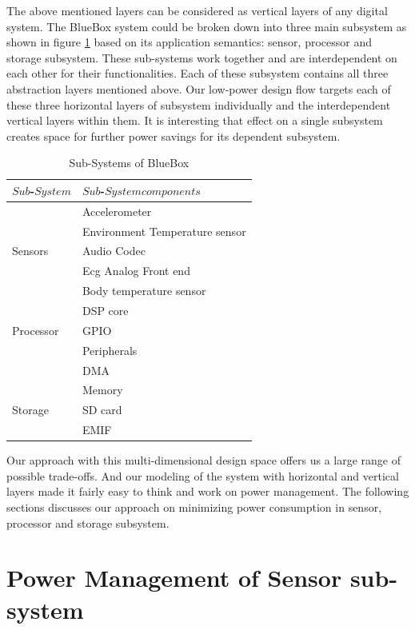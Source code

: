  
The above mentioned layers can be considered as vertical layers of any digital system. The BlueBox system could be broken down into three main subsystem as shown in figure \ref{table:sub-system} based on its application semantics: sensor, processor and storage subsystem. These sub-systems work together and are interdependent on each other for their functionalities. Each of these subsystem contains all three abstraction layers mentioned above. Our low-power design flow targets each of these three horizontal layers of subsystem individually and the interdependent vertical layers within them. It is interesting that effect on a single subsystem creates space for further power savings for its dependent subsystem. 
 
  \begin{table}
 	\centering
 	\begin{tabular}{|l|l|}
 		\hline
 		$Sub$-$System$ & $Sub$-$System  components$  \\
 		\hline
 		& Accelerometer \\
 		& Environment Temperature sensor \\
 		Sensors & Audio Codec \\
 		& Ecg Analog Front end \\
 		& Body temperature sensor\\
 		\hline
 		& DSP core \\
 		Processor & GPIO \\
 		& Peripherals \\
 		& DMA \\
 		& Memory \\
 		\hline
 		Storage & SD card \\
 		& EMIF \\
 		\hline
 	\end{tabular}
 	\caption{Sub-Systems of BlueBox}
 	\label{table:sub-system}
 \end{table}
 
 
Our approach with this multi-dimensional design space offers us a large range of possible trade-offs. And our modeling of the system with horizontal and vertical layers made it fairly easy to think and work on power management. The following sections discusses our approach on minimizing power consumption in sensor, processor and storage subsystem.
 
 \section{Power Management of Sensor sub-system}
 
